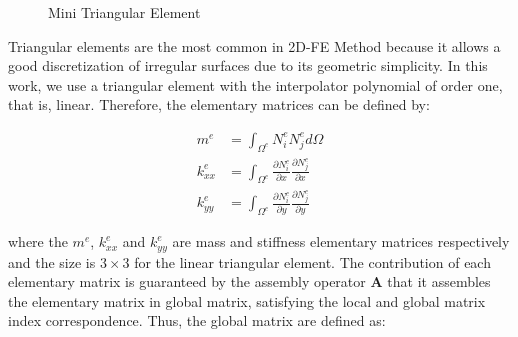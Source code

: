 \begin{figure}[H]
\begin{center}
\end{center}
\caption{Mini Triangular Element}
\label{elemento triangular mini}
\end{figure}






\medskip
Triangular elements are the most common in 2D-FE Method because 
it allows a good discretization of irregular surfaces 
due to its geometric simplicity. In this work, we use a triangular 
element with the interpolator polynomial of order one, that is, linear.
Therefore, the elementary matrices can be defined by:


\begin{equation}
 \begin{aligned}
  m^{e} & = \int_{\Omega^{e}} N_{i}^{e} N_{j}^{e} d\Omega \\
  k_{xx}^{e} & = \int_{\Omega^{e}} \frac{\partial N_{i}^{e}}{\partial x} \frac{\partial N_{j}^{e}}{\partial x} \\
  k_{yy}^{e} & = \int_{\Omega^{e}} \frac{\partial N_{i}^{e}}{\partial y} \frac{\partial N_{j}^{e}}{\partial y}
 \end{aligned}
\end{equation}

\medskip
\noindent
where the
$m^{e}$,
$k^{e}_{xx}$ and
$k^{e}_{yy}$
are mass and stiffness elementary matrices respectively and
the size is $3 \times 3$ for the linear triangular element.
The contribution of each elementary matrix is guaranteed by
the assembly operator \textbf{A}
that it assembles the elementary matrix in
global matrix, satisfying the local and global matrix index
correspondence. Thus, the global matrix are defined as:


